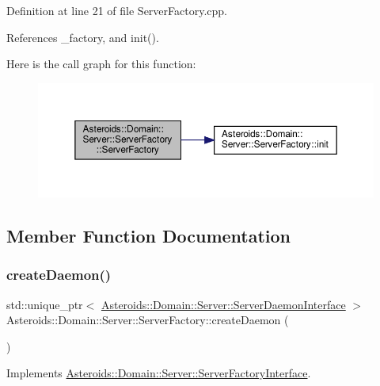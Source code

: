 Definition at line 21 of file Server\+Factory.\+cpp.



References \+\_\+factory, and init().

Here is the call graph for this function\+:\nopagebreak
\begin{figure}[H]
\begin{center}
\leavevmode
\includegraphics[width=350pt]{classAsteroids_1_1Domain_1_1Server_1_1ServerFactory_a7de2a922987247b12190afb667d64fe4_cgraph}
\end{center}
\end{figure}


\subsection{Member Function Documentation}
\mbox{\label{classAsteroids_1_1Domain_1_1Server_1_1ServerFactory_abcb3f5aae1910a28b5b1f574d9b1c57e}} 
\subsubsection{\texorpdfstring{create\+Daemon()}{createDaemon()}}
{\footnotesize\ttfamily std\+::unique\+\_\+ptr$<$ \hyperlink{classAsteroids_1_1Domain_1_1Server_1_1ServerDaemonInterface}{Asteroids\+::\+Domain\+::\+Server\+::\+Server\+Daemon\+Interface} $>$ Asteroids\+::\+Domain\+::\+Server\+::\+Server\+Factory\+::create\+Daemon (\begin{DoxyParamCaption}{ }\end{DoxyParamCaption})\hspace{0.3cm}{\ttfamily [virtual]}}



Implements \hyperlink{classAsteroids_1_1Domain_1_1Server_1_1ServerFactoryInterface_acf3a4bbded1c96d2b9a2954db153c2c5}{Asteroids\+::\+Domain\+::\+Server\+::\+Server\+Factory\+Interface}.



